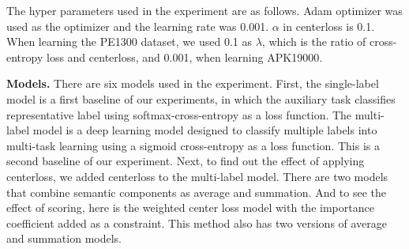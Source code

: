 The hyper parameters used in the experiment are as follows. Adam optimizer\cite{kingma2014adam} was used as the optimizer and the learning rate was 0.001. $\alpha$ in centerloss is 0.1. When learning the PE1300 dataset, we used 0.1 as $\lambda$, which is the ratio of cross-entropy loss and centerloss, and 0.001, when learning APK19000. 


\textbf{Models. }
There are six models used in the experiment. First, the single-label model is a first baseline of our experiments, in which the auxiliary task classifies representative label using softmax-cross-entropy as a loss function. The multi-label model is a deep learning model designed to classify multiple labels into multi-task learning using a sigmoid cross-entropy as a loss function. This is a second baseline of our experiment. Next, to find out the effect of applying centerloss, we added centerloss to the multi-label model. There are two models that combine semantic components as average and summation. And to see the effect of scoring, here is the weighted center loss model with the importance coefficient added as a constraint. This method also has two versions of average and summation models.
  

